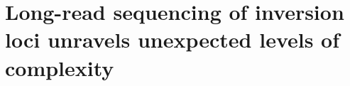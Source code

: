 \section{Long-read sequencing of inversion loci unravels unexpected levels of complexity}


%
%
%
%


